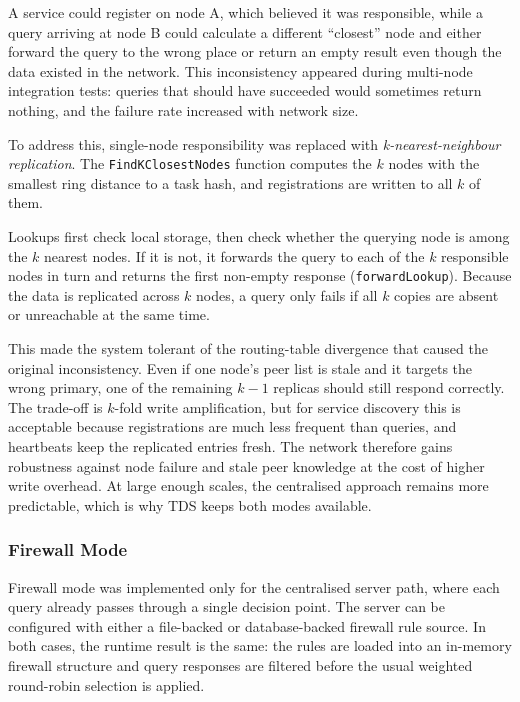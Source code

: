 \documentclass[10pt,a4paper]{article}
\begin{document}
A service could register on node A, which believed it was responsible, while a query arriving at node B could calculate a different ``closest'' node and either forward the query to the wrong place or return an empty result even though the data existed in the network.
This inconsistency appeared during multi-node integration tests: queries that should have succeeded would sometimes return nothing, and the failure rate increased with network size.

To address this, single-node responsibility was replaced with \textit{k-nearest-neighbour replication}.
The \newline\texttt{FindKClosestNodes} function computes the $k$ nodes with the smallest ring distance to a task hash, and registrations are written to all $k$ of them.

Lookups first check local storage, then check whether the querying node is among the $k$ nearest nodes. If it is not, it forwards the query to each of the $k$ responsible nodes in turn and returns the first non-empty response (\texttt{forwardLookup}).
Because the data is replicated across $k$ nodes, a query only fails if all $k$ copies are absent or unreachable at the same time.

This made the system tolerant of the routing-table divergence that caused the original inconsistency. Even if one node's peer list is stale and it targets the wrong primary, one of the remaining $k-1$ replicas should still respond correctly.
The trade-off is $k$-fold write amplification, but for service discovery this is acceptable because registrations are much less frequent than queries, and heartbeats keep the replicated entries fresh.
The network therefore gains robustness against node failure and stale peer knowledge at the cost of higher write overhead. At large enough scales, the centralised approach remains more predictable, which is why TDS keeps both modes available.
\subsubsection{Firewall Mode}
Firewall mode was implemented only for the centralised server path, where each query already passes through a single decision point. The server can be configured with either a file-backed or database-backed firewall rule source. In both cases, the runtime result is the same: the rules are loaded into an in-memory firewall structure and query responses are filtered before the usual weighted round-robin selection is applied.
\end{document}

